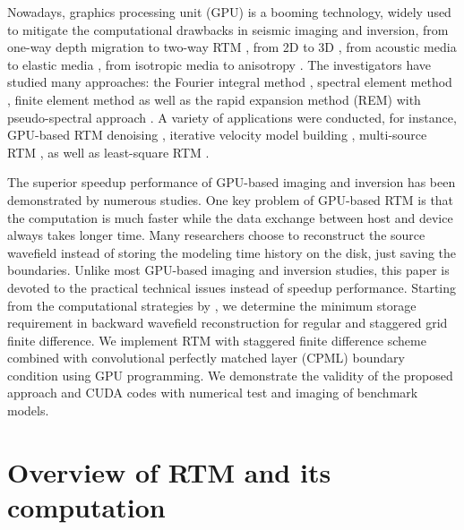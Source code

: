 Nowadays, graphics processing unit (GPU) is a booming technology, widely used to mitigate the computational drawbacks in seismic imaging and inversion, from one-way depth migration \citep{liu2012gpu,lin2012application} to two-way  RTM \citep{hussain2011implementation,micikevicius20093d,clapp2010selecting}, from 2D to 3D  \citep{micikevicius20093d,abdelkhalek2009fast,foltinek2009industrial,liu20133d,michea2010accelerating}, from acoustic media to elastic media \citep{weiss2013solving}, from isotropic media to anisotropy \citep{guo2013application,suh2011expanding,liu2009anisotropic}. The investigators have studied many approaches: the  Fourier integral method \citep{liu2012fourier},  spectral element method \citep{komatitsch2010running}, finite element method \citep{komatitsch2010high} as well as the rapid expansion method (REM) with pseudo-spectral approach \citep{kim2012acceleration}. A variety of applications were conducted, for instance, GPU-based RTM denoising \citep{ying2013denoise}, iterative velocity model building \citep{ji2012iterative}, multi-source RTM \citep{boonyasiriwat2010multisource}, as well as least-square RTM \citep{leader2012least}.


The superior speedup performance of GPU-based imaging and inversion has been demonstrated by numerous studies. One key problem of GPU-based RTM is that the computation is much faster while the data exchange between host and device always takes longer time. Many researchers choose to reconstruct the source wavefield instead of storing the modeling time history on the disk, just saving the boundaries. Unlike most GPU-based imaging and inversion studies, this paper is devoted to the practical technical issues instead of speedup performance. Starting from the computational strategies by \cite{dussaud2008computational}, we determine the minimum storage requirement in backward wavefield reconstruction for regular and staggered grid finite difference. We implement RTM with staggered finite difference scheme combined with convolutional perfectly matched layer (CPML) boundary condition using GPU programming.  We demonstrate the validity of the proposed approach and CUDA codes with numerical test and imaging of benchmark models.


\section{Overview of RTM and its computation}

